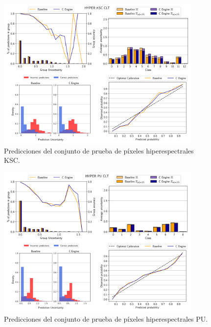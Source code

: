 \begin{figure}[ht]
    \centering
    \includegraphics[width=0.9\textwidth]{root/Imagenes/anexo/CLT-HYPER_KSC-mosaic.png}
    \caption{Predicciones del conjunto de prueba de píxeles hiperespectrales KSC.}
    \label{fig:anx-CLT-HYPER_KSC}
\end{figure}


\begin{figure}[ht]
    \centering
    \includegraphics[width=0.9\textwidth]{root/Imagenes/anexo/CLT-HYPER_PU-mosaic.png}
    \caption{Predicciones del conjunto de prueba de píxeles hiperespectrales PU.}
    \label{fig:anx-CLT-HYPER_PU}
\end{figure}


